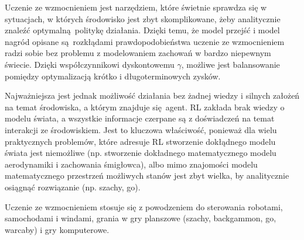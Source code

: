 Uczenie ze wzmocnieniem jest narzędziem, które świetnie sprawdza się w sytuacjach, w których środowisko jest zbyt skomplikowane, żeby analitycznie znaleźć optymalną politykę działania. Dzięki temu, że model przejść i model nagród opisane są rozkłądami prawdopodobieństwa uczenie ze wzmocnieniem radzi sobie bez problemu z modelowaniem zachowań w bardzo niepewnym świecie. Dzięki współczynnikowi dyskontowemu $\gamma$, możliwe jest balansowanie pomiędzy optymalizacją krótko i długoterminowych zysków.

Najważniejsza jest jednak możliwość działania bez żadnej wiedzy i silnych założeń na temat środowiska, a którym znajduje się agent. RL zakłada brak wiedzy o modelu świata, a wszystkie informacje czerpane są z doświadczeń na temat interakcji ze środowiskiem. Jest to kluczowa właściwość, ponieważ dla wielu praktycznych problemów, które adresuje RL stworzenie dokłądnego modelu świata jest niemożliwe (np. stworzenie dokładnego matematycznego modelu aerodynamiki i zachowania śmigłowca), albo mimo znajomości modelu matematycznego przestrzeń możliwych stanów jest zbyt wielka, by analitycznie osiągnąć rozwiązanie (np. szachy, go).

Uczenie ze wzmocnieniem stosuje się z powodzeniem do sterowania robotami, samochodami i windami, grania w gry planszowe (szachy, backgammon, go, warcaby) i gry komputerowe. 




